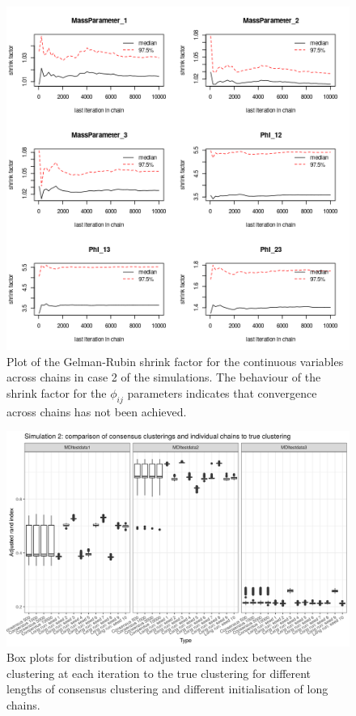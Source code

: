 \documentclass[12pt]{article} %
\begin{document}
	
	\begin{figure}[!htb]
			\centering
			\includegraphics[scale=0.65]{Images/Gen_data/Case_2/Gelman_plot_burn_20000.png}
			\caption{Plot of the  Gelman-Rubin shrink factor for the continuous variables across chains in case 2 of the simulations. The behaviour of the shrink factor for the $\phi_{ij}$ parameters indicates that convergence across chains has not been achieved.}
			\label{fig:gen_data_case_2_gelman_plot}
		\end{figure}
	
	
		\begin{figure}
		\centering
		\includegraphics[scale=0.9]{Images/Gen_data/Case_2/box_plot_ari_true_clustering_burn_in.png}
		\caption{Box plots for distribution of adjusted rand index between the clustering at each iteration to the true clustering for different lengths of consensus clustering and different initialisation of long chains.}
		\label{fig:gen_data_case_2_boxplot}
	\end{figure}
\end{document}
